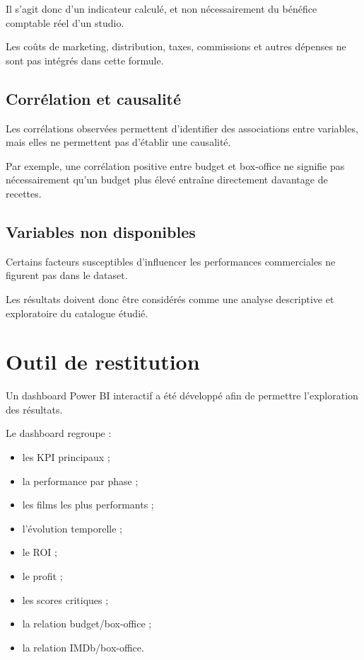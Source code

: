 \documentclass[a4paper,11pt]{article}
\begin{document}
Il s'agit donc d'un indicateur calculé, et non nécessairement du bénéfice
comptable réel d'un studio.

Les coûts de marketing, distribution, taxes, commissions et autres dépenses
ne sont pas intégrés dans cette formule.

\subsection{Corrélation et causalité}

Les corrélations observées permettent d'identifier des associations entre
variables, mais elles ne permettent pas d'établir une causalité.

Par exemple, une corrélation positive entre budget et box-office ne signifie
pas nécessairement qu'un budget plus élevé entraîne directement davantage de
recettes.

\subsection{Variables non disponibles}

Certains facteurs susceptibles d'influencer les performances commerciales ne
figurent pas dans le dataset.

Les résultats doivent donc être considérés comme une analyse descriptive et
exploratoire du catalogue étudié.

\section{Outil de restitution}

Un dashboard Power BI interactif a été développé afin de permettre
l'exploration des résultats.

Le dashboard regroupe :
\begin{itemize}
  \item les KPI principaux ;
  \item la performance par phase ;
  \item les films les plus performants ;
  \item l'évolution temporelle ;
  \item le ROI ;
  \item le profit ;
  \item les scores critiques ;
  \item la relation budget/box-office ;
  \item la relation IMDb/box-office.
\end{itemize}
\end{document}
